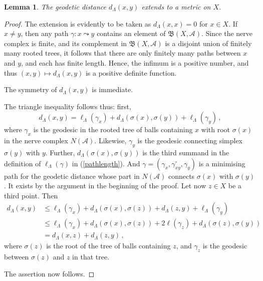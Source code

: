 \documentclass[10pt,a4paper]{amsart}
\newtheorem{lem}{Lemma}
\renewcommand{\le}{\leqslant}\renewcommand{\leq}{\leqslant}
\begin{document}
\begin{lem}
The geodetic distance $d_\Lambda(x,y)$ extends to a metric on $X$.
\end{lem}

\begin{proof}
The extension is evidently to be taken as $d_\Lambda(x,x)=0$ for $x\in X$. If $x\neq y$, then any path $\gamma\colon x\leadsto y$ contains an element of $\mathfrak{B}(X,\mathcal{A})$. Since the nerve complex is finite, and its complement in $\mathfrak{B}(X,\mathcal{A})$ is a disjoint union of finitely many rooted trees, it follows that there are only finitely many paths between $x$ and $y$, and each has finite length. Hence, the infimum is a positive number, and thus $(x,y)\mapsto d_\Lambda(x,y)$ is a positive definite function.  

\smallskip
The symmetry of $d_\Lambda(x,y)$ is immediate.

\smallskip
The triangle inequality follows thus: first,
\[
d_\Lambda(x,y)=\ell_\Lambda(\gamma_x)+d_\Lambda(\sigma(x),\sigma(y))+\ell_\Lambda(\gamma_y)\,,
\]
where $\gamma_x$ is the geodesic in the rooted tree of balls containing $x$ with root $\sigma(x)$ in the nerve complex $N(\mathcal{A})$. Likewise, $\gamma_y$ is the geodesic connecting simplex $\sigma(y)$ with $y$. Further, $d_\Lambda(\sigma(x),\sigma(y))$ is the third summand in the definition of $\ell_\Lambda(\gamma)$ in (\ref{pathlength}). And $\gamma=(\gamma_x,\gamma_{xy}^\circ,\gamma_y)$ is a minimising path for the geodetic distance whose part in $N(\mathcal{A})$ connects $\sigma(x)$ with $\sigma(y)$. It exists by the argument in the beginning of the proof. Let now $z\in X$ be a third point. Then 
\begin{align*}
d_\Lambda(x,y)&\le\ell_\Lambda(\gamma_x)+d_\Lambda(\sigma(x),\sigma(z))+d_\Lambda(z,y)+\ell_\Lambda(\gamma_y)
\\
&\le\ell_\Lambda(\gamma_x)+d_\Lambda(\sigma(x),\sigma(z))+2\ell(\gamma_z)+d_\Lambda(\sigma(z),\sigma(y))
\\
&=d_\Lambda(x,z)+d_\Lambda(z,y)\,,
\end{align*}
where $\sigma(z)$ is the root of the tree of balls containing $z$, and $\gamma_z$ is the geodesic between $\sigma(z)$ and $z$ in that tree.

\smallskip
The assertion now follows.
\end{proof}
\end{document}
